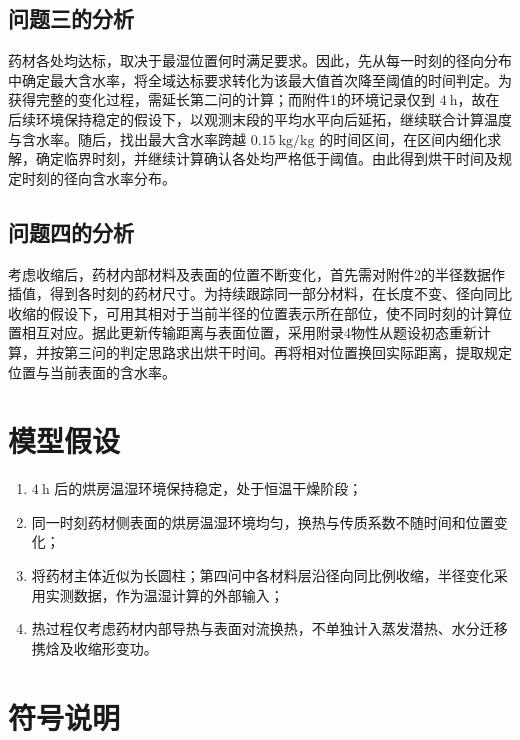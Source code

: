 \documentclass[UTF8,a4paper]{ctexart}
\begin{document}
\subsection{问题三的分析}

药材各处均达标，取决于最湿位置何时满足要求。因此，先从每一时刻的径向分布中确定最大含水率，将全域达标要求转化为该最大值首次降至阈值的时间判定。为获得完整的变化过程，需延长第二问的计算；而附件1的环境记录仅到 \(4~\mathrm{h}\)，故在后续环境保持稳定的假设下，以观测末段的平均水平向后延拓，继续联合计算温度与含水率。随后，找出最大含水率跨越 \(0.15~\mathrm{kg/kg}\) 的时间区间，在区间内细化求解，确定临界时刻，并继续计算确认各处均严格低于阈值。由此得到烘干时间及规定时刻的径向含水率分布。

\subsection{问题四的分析}

考虑收缩后，药材内部材料及表面的位置不断变化，首先需对附件2的半径数据作插值，得到各时刻的药材尺寸。为持续跟踪同一部分材料，在长度不变、径向同比收缩的假设下，可用其相对于当前半径的位置表示所在部位，使不同时刻的计算位置相互对应。据此更新传输距离与表面位置，采用附录4物性从题设初态重新计算，并按第三问的判定思路求出烘干时间。再将相对位置换回实际距离，提取规定位置与当前表面的含水率。



\section{模型假设}

\begin{enumerate}[itemsep=0pt,parsep=0pt]
\item \(4~\mathrm{h}\) 后的烘房温湿环境保持稳定，处于恒温干燥阶段；
\item 同一时刻药材侧表面的烘房温湿环境均匀，换热与传质系数不随时间和位置变化；
\item 将药材主体近似为长圆柱；第四问中各材料层沿径向同比例收缩，半径变化采用实测数据，作为温湿计算的外部输入；
\item 热过程仅考虑药材内部导热与表面对流换热，不单独计入蒸发潜热、水分迁移携焓及收缩形变功。
\end{enumerate}



\section{符号说明}
\end{document}
